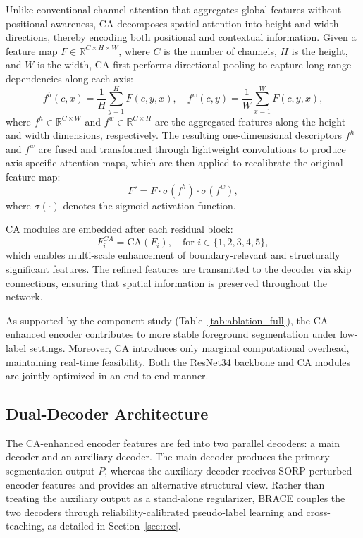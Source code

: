 \documentclass[a4paper,fleqn]{cas-dc}
\begin{document}
Unlike conventional channel attention that aggregates global features without positional awareness, CA decomposes spatial attention into height and width directions, thereby encoding both positional and contextual information. Given a feature map $F \in \mathbb{R}^{C \times H \times W}$, where $C$ is the number of channels, $H$ is the height, and $W$ is the width, CA first performs directional pooling to capture long-range dependencies along each axis:
\begin{equation}
f^h(c, x) = \frac{1}{H} \sum_{y=1}^{H} F(c, y, x), \quad 
f^w(c, y) = \frac{1}{W} \sum_{x=1}^{W} F(c, y, x),
\end{equation}
where $f^h \in \mathbb{R}^{C \times W}$ and $f^w \in \mathbb{R}^{C \times H}$ are the aggregated features along the height and width dimensions, respectively. The resulting one-dimensional descriptors $f^h$ and $f^w$ are fused and transformed through lightweight convolutions to produce axis-specific attention maps, which are then applied to recalibrate the original feature map:
\begin{equation}
F' = F \cdot \sigma(f^h) \cdot \sigma(f^w),
\end{equation}
where $\sigma(\cdot)$ denotes the sigmoid activation function.

CA modules are embedded after each residual block:
\begin{equation}
F_i^{CA} = \text{CA}(F_i), \quad \text{for } i \in \{1, 2, 3, 4, 5\},
\end{equation}
which enables multi-scale enhancement of boundary-relevant and structurally significant features. The refined features are transmitted to the decoder via skip connections, ensuring that spatial information is preserved throughout the network.

As supported by the component study (Table~\ref{tab:ablation_full}), the CA-enhanced encoder contributes to more stable foreground segmentation under low-label settings. Moreover, CA introduces only marginal computational overhead, maintaining real-time feasibility. Both the ResNet34 backbone and CA modules are jointly optimized in an end-to-end manner.

\subsection{Dual-Decoder Architecture}

The CA-enhanced encoder features are fed into two parallel decoders: a main decoder and an auxiliary decoder. The main decoder produces the primary segmentation output $P$, whereas the auxiliary decoder receives SORP-perturbed encoder features and provides an alternative structural view. Rather than treating the auxiliary output as a stand-alone regularizer, BRACE couples the two decoders through reliability-calibrated pseudo-label learning and cross-teaching, as detailed in Section~\ref{sec:rcc}.
\end{document}
